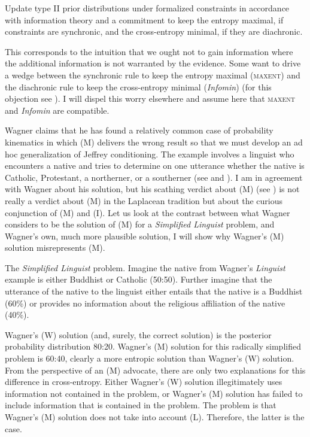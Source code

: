 \documentclass[11pt]{article}
\begin{document}
\begin{quotex}
  Update type II prior distributions under formalized constraints in
  accordance with information theory and a commitment to keep the
  entropy maximal, if constraints are synchronic, and the
  cross-entropy minimal, if they are diachronic.
\end{quotex}

This corresponds to the intuition that we ought not to gain
information where the additional information is not warranted by the
evidence. Some want to drive a wedge between the synchronic rule to
keep the entropy maximal (\textsc{maxent}) and the diachronic rule to
keep the cross-entropy minimal (\emph{Infomin}) (for this objection
see ). I will dispel this worry elsewhere and
assume here that \textsc{maxent} and \emph{Infomin} are compatible.

Wagner claims that he has found a relatively common case of
probability kinematics in which (M) delivers the wrong result so that
we must develop an ad hoc generalization of Jeffrey conditioning. The
example involves a linguist who encounters a native and tries to
determine on one utterance whether the native is Catholic, Protestant,
a northerner, or a southerner (see  and
). I am in agreement with Wagner about his
solution, but his scathing verdict about (M) (see
) is not really a verdict about (M) in the
Laplacean tradition but about the curious conjunction of (M) and (I).
Let us look at the contrast between what Wagner considers to be the
solution of (M) for a \emph{Simplified Linguist} problem,
 and Wagner's own, much more plausible
solution,  I will show why Wagner's (M)
solution misrepresents (M).

\begin{quotex}
  The \emph{Simplified Linguist} problem. Imagine the native from
  Wagner's \emph{Linguist} example is either Buddhist or Catholic
  (50:50). Further imagine that the utterance of the native to the
  linguist either entails that the native is a Buddhist (60\%) or
  provides no information about the religious affiliation of the
  native (40\%).
\end{quotex}

Wagner's (W) solution (and, surely, the correct solution) is the
posterior probability distribution 80:20. Wagner's (M) solution for
this radically simplified problem is 60:40, clearly a more entropic
solution than Wagner's (W) solution. From the perspective of an (M)
advocate, there are only two explanations for this difference in
cross-entropy. Either Wagner's (W) solution illegitimately uses
information not contained in the problem, or Wagner's (M) solution has
failed to include information that is contained in the problem. The
problem is that Wagner's (M) solution does not take into account (L).
Therefore, the latter is the case.
\end{document}

